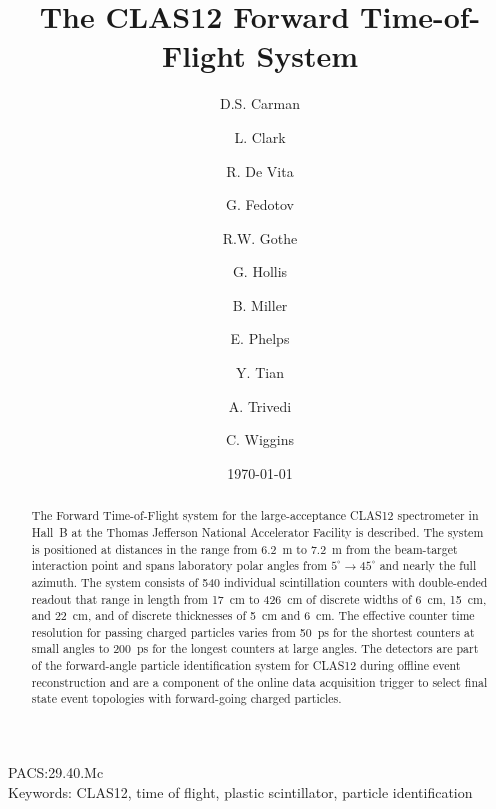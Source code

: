\documentclass[3p,times,twocolumn]{elsarticle}
\begin{document}
\begin{frontmatter}

\title{The CLAS12 Forward Time-of-Flight System}

\author[JLab]{D.S. Carman}
\author[Glasgow]{L. Clark}
\author[INFN]{R. De Vita}
\author[USC]{G. Fedotov}
\author[USC]{R.W. Gothe}
\author[USC]{G. Hollis}
\author[JLab]{B. Miller}
\author[USC]{E. Phelps}
\author[USC]{Y. Tian}
\author[USC]{A. Trivedi}
\author[JLab]{C. Wiggins}

\address[JLab]{Thomas Jefferson National Accelerator Facility, Newport News, VA 23606, USA}
\address[USC]{University of South Carolina, Columbia, SC 29208, USA}
\address[Glasgow]{University of Glasgow, Glasgow G12 8QQ, United Kingdom}
\address[INFN]{INFN, Sezione di Genova, 16146 Genova, Italy}

\date{\today}


\begin{abstract}
The Forward Time-of-Flight system for the large-acceptance CLAS12 spectrometer in Hall~B at the
Thomas Jefferson National Accelerator Facility is described. The system is positioned at distances
in the range from 6.2~m to 7.2~m from the beam-target interaction point and spans laboratory polar
angles from $5^\circ \to 45^\circ$ and nearly the full azimuth. The system consists of 540 individual
scintillation counters with double-ended readout that range in length from 17~cm to 426~cm of
discrete widths of 6~cm, 15~cm, and 22~cm, and of discrete thicknesses of 5~cm and 6~cm. The
effective counter time resolution for passing charged particles varies from 50~ps for the shortest
counters at small angles to 200~ps for the longest counters at large angles. The detectors are part
of the forward-angle particle identification system for CLAS12 during offline event reconstruction
and are a component of the online data acquisition trigger to select final state event topologies with
forward-going charged particles.
\end{abstract}

\end{frontmatter}

PACS:29.40.Mc \\
Keywords: CLAS12, time of flight, plastic scintillator, particle identification
\end{document}
